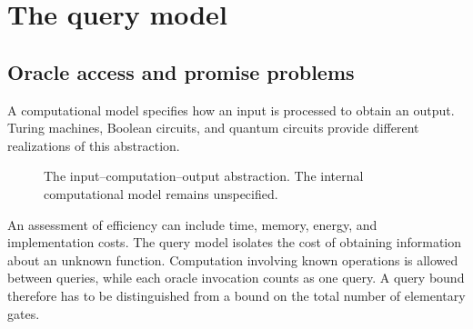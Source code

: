\documentclass[11pt,oneside,openany]{book}
\theoremstyle{definition}
\begin{document}
\section{The query model}
\label{sec:query-model}

\subsection{Oracle access and promise problems}
A computational model specifies how an input is processed to obtain an output. Turing machines, Boolean circuits, and quantum circuits provide different realizations of this abstraction.
\par
\begin{figure}[htbp]
\centering
{}
\caption{The input--computation--output abstraction. The internal computational model remains unspecified.}
\label{fig:computation-model}
\end{figure}
\par
An assessment of efficiency can include time, memory, energy, and implementation costs. The query model isolates the cost of obtaining information about an unknown function. Computation involving known operations is allowed between queries, while each oracle invocation counts as one query. A query bound therefore has to be distinguished from a bound on the total number of elementary gates.
\end{document}
